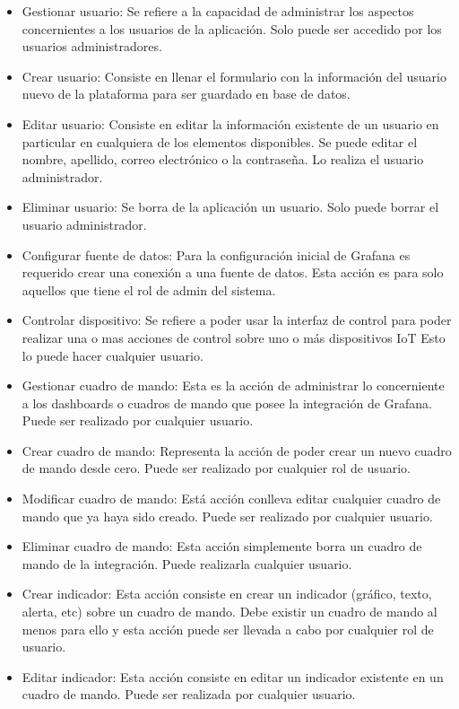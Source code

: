 \begin{itemize}
\item Gestionar usuario: Se refiere a la capacidad de administrar los aspectos concernientes a los usuarios de la aplicación. Solo puede ser accedido por los usuarios administradores.
\item Crear usuario: Consiste en llenar el formulario con la información del usuario nuevo de la plataforma para ser guardado en base de datos.
\item Editar usuario: Consiste en editar la información existente de un usuario en particular en cualquiera de los elementos disponibles. Se puede editar el nombre, apellido, correo electrónico o la contraseña. Lo realiza el usuario administrador.
\item Eliminar usuario: Se borra de la aplicación un usuario. Solo puede borrar el usuario administrador.
\item Configurar fuente de datos: Para la configuración inicial de Grafana es requerido crear una conexión a una fuente de datos. Esta acción es para solo aquellos que tiene el rol de admin del sistema.
\item Controlar dispositivo: Se refiere a poder usar la interfaz de control para poder realizar una o mas acciones de control sobre uno o más dispositivos IoT Esto lo puede hacer cualquier usuario.
\item Gestionar cuadro de mando: Esta es la acción de administrar lo concerniente a los dashboards o cuadros de mando que posee la integración de Grafana. Puede ser realizado por cualquier usuario.
\item Crear cuadro de mando: Representa la acción de poder crear un nuevo cuadro de mando desde cero. Puede ser realizado por cualquier rol de usuario.
\item Modificar cuadro de mando: Está acción conlleva editar cualquier cuadro de mando que ya haya sido creado. Puede ser realizado por cualquier usuario.
\item Eliminar cuadro de mando: Esta acción simplemente borra un cuadro de mando de la integración. Puede realizarla cualquier usuario.
\item Crear indicador: Esta acción consiste en crear un indicador (gráfico, texto, alerta, etc) sobre un cuadro de mando. Debe existir un cuadro de mando al menos para ello y esta acción puede ser llevada a cabo por cualquier rol de usuario.
\item Editar indicador: Esta acción consiste en editar un indicador existente en un cuadro de mando. Puede ser realizada por cualquier usuario. 

\end{itemize}
